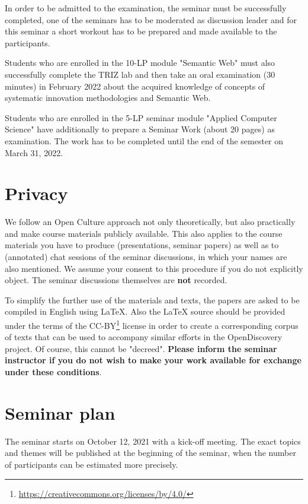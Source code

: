 \documentclass[11pt,a4paper]{article}
\begin{document}
In order to be admitted to the examination, the seminar must be successfully
completed, one of the seminars has to be moderated as discussion leader and
for this seminar a short workout has to be prepared and made available to the
participants.

Students who are enrolled in the 10-LP module "Semantic Web" must also
successfully complete the TRIZ lab and then take an oral examination (30
minutes) in February 2022 about the acquired knowledge of concepts of
systematic innovation methodologies and Semantic Web.

Students who are enrolled in the 5-LP seminar module "Applied Computer
Science" have additionally to prepare a Seminar Work (about 20 pages) as
examination.  The work has to be completed until the end of the semester on
March 31, 2022.

\section{Privacy}

We follow an Open Culture approach not only theoretically, but also
practically and make course materials publicly available.  This also applies
to the course materials you have to produce (presentations, seminar papers) as
well as to (annotated) chat sessions of the seminar discussions, in which your
names are also mentioned.  We assume your consent to this procedure if you do
not explicitly object.  The seminar discussions themselves are \textbf{not}
recorded.

To simplify the further use of the materials and texts, the papers are asked
to be compiled in English using {\LaTeX}.  Also the {\LaTeX} source should be
provided under the terms of the
CC-BY\footnote{\url{https://creativecommons.org/licenses/by/4.0/}} license in
order to create a corresponding corpus of texts that can be used to accompany
similar efforts in the OpenDiscovery project. Of course, this cannot be
"decreed". \textbf{Please inform the seminar instructor if you do not wish to
  make your work available for exchange under these conditions}.

\section{Seminar plan}

The seminar starts on October 12, 2021 with a kick-off meeting.  The exact
topics and themes will be published at the beginning of the seminar, when the
number of participants can be estimated more precisely.
\end{document}
